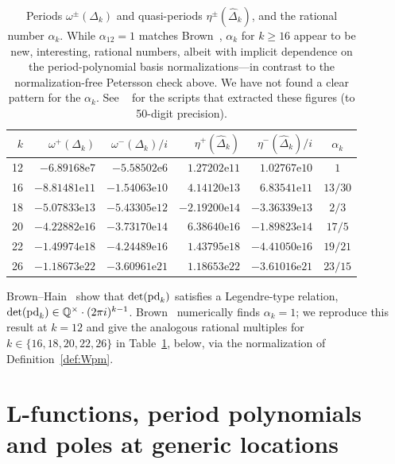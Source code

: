 \documentclass[11pt]{article}
\newcommand{\QQ}{\mathbb{Q}}
\newcommand{\Dhat}{\widehat{\Delta}}
\begin{document}
\begin{table}[H]\centering\small
\begin{tabular}{r|rrrr|c}
$k$ & $\omega^+(\Delta_k)$ & $\omega^-(\Delta_k)/i$ & $\eta^+(\Dhat_k)$ & $\eta^-(\Dhat_k)/i$ & $\alpha_k$\\\hline
12 & $-6.89168\mathrm{e}7$  & $-5.58502\mathrm{e}6$  & $1.27202\mathrm{e}{11}$ & $1.02767\mathrm{e}{10}$  & $1$\\
16 & $-8.81481\mathrm{e}{11}$ & $-1.54063\mathrm{e}{10}$ & $4.14120\mathrm{e}{13}$ & $6.83541\mathrm{e}{11}$ & $13/30$\\
18 & $-5.07833\mathrm{e}{13}$ & $-5.43305\mathrm{e}{12}$ & $-2.19200\mathrm{e}{14}$ & $-3.36339\mathrm{e}{13}$ & $2/3$\\
20 & $-4.22882\mathrm{e}{16}$ & $-3.73170\mathrm{e}{14}$ & $6.38640\mathrm{e}{16}$ & $-1.89823\mathrm{e}{14}$ & $17/5$\\
22 & $-1.49974\mathrm{e}{18}$ & $-4.24489\mathrm{e}{16}$ & $1.43795\mathrm{e}{18}$ & $-4.41050\mathrm{e}{16}$ & $19/21$\\
26 & $-1.18673\mathrm{e}{22}$ & $-3.60961\mathrm{e}{21}$ & $1.18653\mathrm{e}{22}$ & $-3.61016\mathrm{e}{21}$ & $23/15$\\
\end{tabular}\caption{Periods $\omega^\pm(\Delta_k)$ and quasi-periods 
$\eta^\pm(\Dhat_k)$, and the rational number $\alpha_k$. While 
$\alpha_{12} = 1$ matches Brown~\cite{Brown2017}, $\alpha_k$ for $k\ge16$ 
appear to be new, interesting, rational numbers, albeit with implicit dependence
on the period-polynomial basis normalizations---in contrast to the normalization-free
Petersson check above. We have not found a clear pattern
for the $\alpha_k$. See ~\cite{VerifyScripts} for the scripts that extracted these 
figures (to 50-digit precision).
}\label{tab:periods}
\end{table}

Brown--Hain~\cite[Prop.~5.6]{BrownHain2018} show that $\det({\rm pd}_k)$ satisfies a 
Legendre-type relation, $\det({\rm pd}_k)\in\QQ^\times\cdot(2\pi i)^{k-1}$. Brown~\cite[\S8.3]{Brown2017}
numerically finds $\alpha_k=1$; we reproduce this result at $k=12$ and give the analogous
rational multiples for $k \in \{16, 18, 20, 22, 26\}$ in Table~\ref{tab:periods}, below,
via the normalization of Definition~\ref{def:Wpm}. 


\section{L-functions, period polynomials and poles at generic locations}\label{sec:arc}
\end{document}
